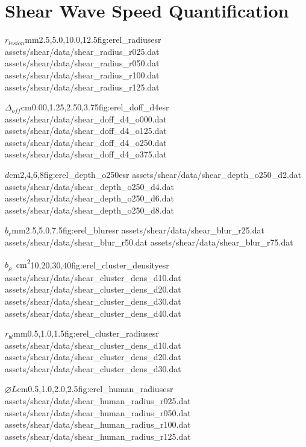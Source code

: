 	\section{Shear Wave Speed Quantification}
	\label{appsec:dt_shear}
		\begin{multicols}{2}
			\characterizationDataTable%
				{$r_{lesion}$}{mm}{2.5,5.0,10.0,12.5}{fig:erel_radius}{esr}%
				{assets/shear/data/shear_radius_r025.dat}%
				{assets/shear/data/shear_radius_r050.dat}%
				{assets/shear/data/shear_radius_r100.dat}%
				{assets/shear/data/shear_radius_r125.dat}

			\characterizationDataTable%
				{$\Delta_{off}$}{cm}{0.00,1.25,2.50,3.75}{fig:erel_doff_d4}{esr}%
				{assets/shear/data/shear_doff_d4_o000.dat}%
				{assets/shear/data/shear_doff_d4_o125.dat}%
				{assets/shear/data/shear_doff_d4_o250.dat}%
				{assets/shear/data/shear_doff_d4_o375.dat}

			\characterizationDataTable%
				{$d$}{cm}{2,4,6,8}{fig:erel_depth_o250}{esr}%
				{assets/shear/data/shear_depth_o250_d2.dat}%
				{assets/shear/data/shear_depth_o250_d4.dat}%
				{assets/shear/data/shear_depth_o250_d6.dat}%
				{assets/shear/data/shear_depth_o250_d8.dat}

			\characterizationDataTable%
				{$b_r$}{mm}{2.5,5.0,7.5}{fig:erel_blur}{esr}%
				{assets/shear/data/shear_blur_r25.dat}%
				{assets/shear/data/shear_blur_r50.dat}%
				{assets/shear/data/shear_blur_r75.dat}%
				{}

			\characterizationDataTable%
				{$b_\rho$}{\si{\per\cm\squared}}{10,20,30,40}{fig:erel_cluster_density}{esr}%
				{assets/shear/data/shear_cluster_dens_d10.dat}%
				{assets/shear/data/shear_cluster_dens_d20.dat}%
				{assets/shear/data/shear_cluster_dens_d30.dat}%
				{assets/shear/data/shear_cluster_dens_d40.dat}

			\characterizationDataTable%
				{$r_{bl}$}{mm}{0.5,1.0,1.5}{fig:erel_cluster_radius}{esr}%
				{assets/shear/data/shear_cluster_dens_d10.dat}%
				{assets/shear/data/shear_cluster_dens_d20.dat}%
				{assets/shear/data/shear_cluster_dens_d30.dat}%
				{}

			\characterizationDataTable%
				{$\diameter L$}{cm}{0.5,1.0,2.0,2.5}{fig:erel_human_radius}{esr}%
				{assets/shear/data/shear_human_radius_r025.dat}%
				{assets/shear/data/shear_human_radius_r050.dat}%
				{assets/shear/data/shear_human_radius_r100.dat}%
				{assets/shear/data/shear_human_radius_r125.dat}
		\end{multicols}